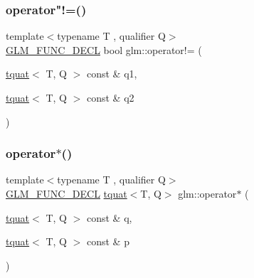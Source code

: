 \subsubsection{\texorpdfstring{operator"!=()}{operator!=()}}
{\footnotesize\ttfamily template$<$typename T , qualifier Q$>$ \\
\mbox{\hyperlink{setup_8hpp_ab2d052de21a70539923e9bcbf6e83a51}{G\+L\+M\+\_\+\+F\+U\+N\+C\+\_\+\+D\+E\+CL}} bool glm\+::operator!= (\begin{DoxyParamCaption}\item[{\mbox{\hyperlink{structglm_1_1tquat}{tquat}}$<$ T, Q $>$ const \&}]{q1,  }\item[{\mbox{\hyperlink{structglm_1_1tquat}{tquat}}$<$ T, Q $>$ const \&}]{q2 }\end{DoxyParamCaption})}

\mbox{\label{group__gtc__quaternion_ga447cda99bd10c12696177d490049a8f5}} 
\subsubsection{\texorpdfstring{operator$\ast$()}{operator*()}\hspace{0.1cm}{\footnotesize\ttfamily [1/7]}}
{\footnotesize\ttfamily template$<$typename T , qualifier Q$>$ \\
\mbox{\hyperlink{setup_8hpp_ab2d052de21a70539923e9bcbf6e83a51}{G\+L\+M\+\_\+\+F\+U\+N\+C\+\_\+\+D\+E\+CL}} \mbox{\hyperlink{structglm_1_1tquat}{tquat}}$<$T, Q$>$ glm\+::operator$\ast$ (\begin{DoxyParamCaption}\item[{\mbox{\hyperlink{structglm_1_1tquat}{tquat}}$<$ T, Q $>$ const \&}]{q,  }\item[{\mbox{\hyperlink{structglm_1_1tquat}{tquat}}$<$ T, Q $>$ const \&}]{p }\end{DoxyParamCaption})}

\mbox{\label{group__gtc__quaternion_ga01cacfba4a28b21e7af7cdbb122c4ef9}} 
